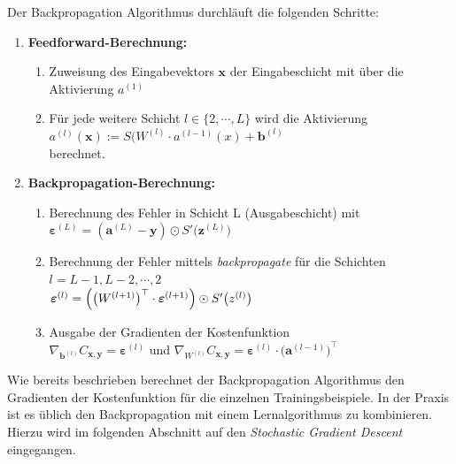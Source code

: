 \noindent
Der Backpropagation Algorithmus durchläuft die folgenden Schritte:
\begin{enumerate}
\item \textbf{Feedforward-Berechnung:}
\begin{enumerate}
\item Zuweisung des Eingabevektors $\textbf{x}$ der Eingabeschicht mit über die Aktivierung $a^{(1)}$
\item Für jede weitere Schicht $l \in \{2,\cdots , L\}$ wird die Aktivierung 
\\[0.2cm]
\hspace*{1.3cm}
$a^{(l)}(\mathbf{x}) := S(W^{(l)} \cdot a^{(l-1)}(x) + \mathbf{b}^{(l)}$
\\[0.2cm] 
berechnet.
\end{enumerate}
\item \textbf{Backpropagation-Berechnung:}
\begin{enumerate}
\item Berechnung des Fehler in Schicht L (Ausgabeschicht) mit 
\\[0.2cm]
\hspace*{1.3cm}
$\boldsymbol{\varepsilon}^{(L)} = (\mathbf{a}^{(L)} - \mathbf{y}) \odot S'\bigl(\mathbf{z}^{(L)}\bigr)  $
\\[0.2cm] 

\item Berechnung der Fehler mittels \textit{backpropagate} für die Schichten $l = L-1, L-2, \cdots , 2$
\\[0.2cm]
\hspace*{1.3cm}
$\boldsymbol{\varepsilon}^{(l)} = \Bigl(\bigl(W^{(l+1)}\bigr)^\top \cdot \boldsymbol{\varepsilon}^{(l+1)}\Bigr) \odot
  S'\bigl(z^{(l)}\bigr)$
\\[0.2cm] 

\item Ausgabe der Gradienten der Kostenfunktion 
\\[0.2cm]
\hspace*{1.3cm}
$\nabla_{\mathbf{b}^{(l)}} C_{\mathbf{x}, \mathbf{y}} = \boldsymbol{\varepsilon}^{(l)}$ \quad und \quad
$\nabla_{W^{(l)}} C_{\mathbf{x}, \mathbf{y}} = \boldsymbol{\varepsilon}^{(l)} \cdot \bigl(\mathbf{a}^{(l-1)}\bigr)^\top$
\\[0.2cm] 
\end{enumerate}
\end{enumerate}

\noindent
Wie bereits beschrieben berechnet der Backpropagation Algorithmus den Gradienten der Kostenfunktion für die einzelnen Trainingsbeispiele. In der Praxis ist es üblich den Backpropagation mit einem Lernalgorithmus zu kombinieren. Hierzu wird im folgenden Abschnitt auf den \textit{Stochastic Gradient Descent} eingegangen.

